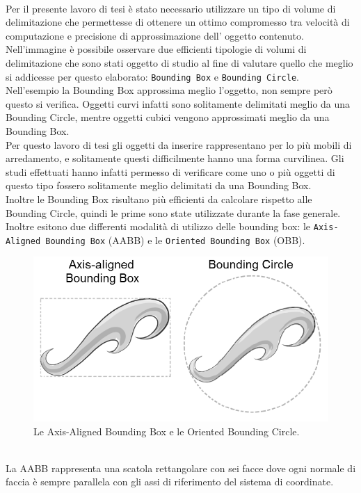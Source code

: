 \\
Per il presente lavoro di tesi è stato necessario utilizzare un tipo di volume di delimitazione che permettesse di ottenere un ottimo compromesso tra velocità di computazione e precisione di approssimazione dell’ oggetto contenuto.
\\
Nell’immagine è possibile osservare due efficienti tipologie di volumi di delimitazione che sono stati oggetto di studio al fine di valutare quello che meglio si addicesse per questo elaborato: \texttt{Bounding Box} e \texttt{Bounding Circle}.
\\
Nell’esempio la Bounding Box approssima meglio l’oggetto, non sempre però questo si verifica. 
Oggetti curvi infatti sono solitamente delimitati meglio da una Bounding Circle, mentre oggetti cubici vengono approssimati meglio da una Bounding Box.
\\
Per questo lavoro di tesi gli oggetti da inserire rappresentano per lo più mobili di arredamento, e solitamente questi difficilmente hanno una forma curvilinea. Gli studi effettuati hanno infatti permesso di verificare come uno o più oggetti di questo tipo fossero solitamente meglio delimitati da una Bounding Box.
\\
Inoltre le Bounding Box risultano più efficienti da calcolare rispetto alle Bounding Circle, quindi le prime sono state utilizzate durante la fase generale.
Inoltre esitono due differenti modalità di utilizzo delle bounding box: le \texttt{Axis-Aligned Bounding Box} (AABB) e le \texttt{Oriented Bounding Box} (OBB).
\begin{figure}[htb]
 \centering
 \includegraphics[width=0.7\linewidth]{images/chapter_navigazione_scena/box1.png}\hfill
 \caption[AABB e OBB.]{Le Axis-Aligned Bounding Box e le Oriented Bounding Circle.}
 \label{fig:navigazione_scena_navigator_oculus}
\end{figure}
\\
La AABB rappresenta una scatola rettangolare con sei facce dove ogni normale di faccia è sempre parallela con gli assi di riferimento del sistema di coordinate.
